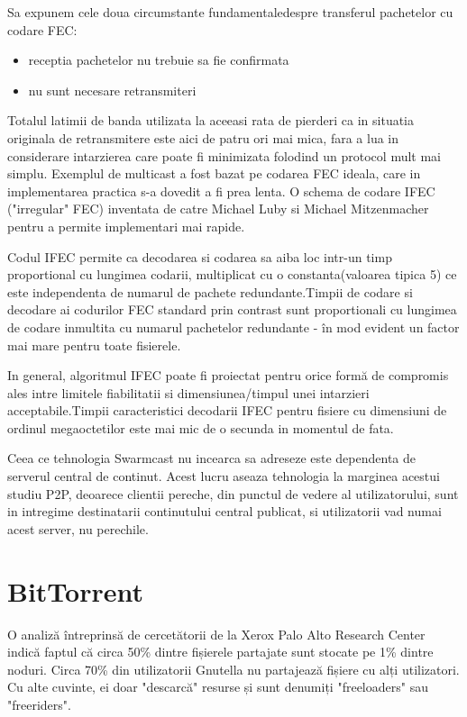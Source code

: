 Sa expunem cele doua circumstante fundamentaledespre transferul pachetelor cu
codare FEC:
\begin{itemize}
  \item receptia pachetelor nu trebuie sa fie confirmata
  \item nu sunt necesare retransmiteri
\end{itemize}

Totalul latimii de banda utilizata la aceeasi rata de pierderi ca in situatia
originala de retransmitere este aici de patru ori mai mica, fara a lua in
considerare intarzierea care poate fi minimizata folodind  un protocol mult
mai simplu. Exemplul de multicast a fost bazat pe codarea FEC ideala, care in
implementarea practica s-a dovedit a fi prea lenta. O schema de codare IFEC
("irregular" FEC) inventata de catre Michael Luby si Michael Mitzenmacher
pentru a permite implementari mai rapide.

Codul IFEC permite ca decodarea si codarea sa aiba loc intr-un timp
proportional cu lungimea codarii, multiplicat cu o constanta(valoarea tipica
5) ce este independenta de numarul de pachete redundante.Timpii de codare si
decodare ai codurilor FEC standard prin contrast sunt proportionali cu
lungimea de codare inmultita cu numarul pachetelor redundante - în mod evident
un factor mai mare pentru toate fisierele.

In general, algoritmul IFEC poate fi proiectat pentru orice formă de compromis
ales intre limitele fiabilitatii  si dimensiunea/timpul unei intarzieri
acceptabile.Timpii caracteristici decodarii IFEC pentru fisiere cu dimensiuni
de ordinul megaoctetilor este mai mic de o secunda in momentul de fata.

Ceea ce tehnologia Swarmcast nu incearca sa adreseze este dependenta de
serverul central de continut. Acest lucru aseaza tehnologia la marginea
acestui studiu P2P, deoarece clientii pereche, din punctul de vedere al
utilizatorului, sunt in intregime destinatarii continutului central publicat,
si utilizatorii vad numai acest server, nu perechile.

\section{BitTorrent}
\label{sec:p2p-systems:bittorrent}

O analiză întreprinsă de cercetătorii de la Xerox Palo Alto Research Center
indică faptul că circa 50\% dintre fișierele partajate sunt stocate pe 1\%
dintre noduri. Circa 70\% din utilizatorii Gnutella nu partajează fișiere cu
alți utilizatori. Cu alte cuvinte, ei doar "descarcă" resurse și sunt denumiți
"freeloaders" sau "freeriders".

